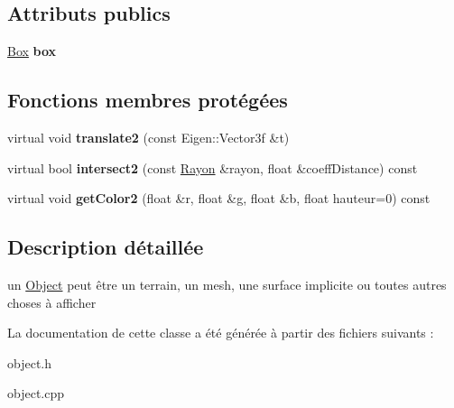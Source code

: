 \subsection*{Attributs publics}
\begin{DoxyCompactItemize}
\item 
\hypertarget{class_object_ad8eb0b4f6b395fbbc3e98c5c8b78a57e}{}\hyperlink{class_box}{Box} {\bfseries box}\label{class_object_ad8eb0b4f6b395fbbc3e98c5c8b78a57e}

\end{DoxyCompactItemize}
\subsection*{Fonctions membres protégées}
\begin{DoxyCompactItemize}
\item 
\hypertarget{class_object_a212692c058ebdcd08cb2e4dbd090701e}{}virtual void {\bfseries translate2} (const Eigen\+::\+Vector3f \&t)\label{class_object_a212692c058ebdcd08cb2e4dbd090701e}

\item 
\hypertarget{class_object_a5f723145432810ca346c8e61a10d7528}{}virtual bool {\bfseries intersect2} (const \hyperlink{class_rayon}{Rayon} \&rayon, float \&coeff\+Distance) const \label{class_object_a5f723145432810ca346c8e61a10d7528}

\item 
\hypertarget{class_object_aeaeb7a55914aabe7b87330ed4a89c351}{}virtual void {\bfseries get\+Color2} (float \&r, float \&g, float \&b, float hauteur=0) const \label{class_object_aeaeb7a55914aabe7b87330ed4a89c351}

\end{DoxyCompactItemize}


\subsection{Description détaillée}
un \hyperlink{class_object}{Object} peut être un terrain, un mesh, une surface implicite ou toutes autres choses à afficher 

La documentation de cette classe a été générée à partir des fichiers suivants \+:\begin{DoxyCompactItemize}
\item 
object.\+h\item 
object.\+cpp\end{DoxyCompactItemize}
